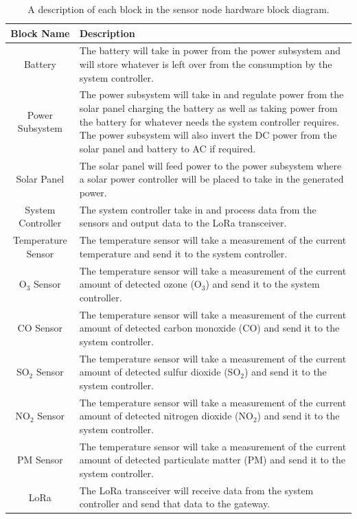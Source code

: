 \documentclass[titlepage, 11pt, letterpaper]{article}
\begin{document}
\begin{table}[H]
    \centering
    \caption{A description of each block in the sensor node hardware block diagram.}
    \begin{tabularx}{\linewidth}{|c|X|}
        \hline
        Block Name & Description \\ 
        \hline
        Battery & The battery will take in power from the power subsystem and will store whatever is left over from the consumption by the system controller. \\\hline
        Power Subsystem & The power subsystem will take in and regulate power from the solar panel charging the battery as well as taking power from the battery for whatever needs the system controller requires. The power subsystem will also invert the DC power from the solar panel and battery to AC if required. \\\hline
        Solar Panel & The solar panel will feed power to the power subsystem where a solar power controller will be placed to take in the generated power. \\\hline
        System Controller & The system controller take in and process data from the sensors and output data to the LoRa transceiver. \\\hline
        Temperature Sensor & The temperature sensor will take a measurement of the current temperature and send it to the system controller. \\\hline
        O$_3$ Sensor & The temperature sensor will take a measurement of the current amount of detected ozone (O$_3$) and send it to the system controller. \\\hline
        CO Sensor & The temperature sensor will take a measurement of the current amount of detected carbon monoxide (CO) and send it to the system controller. \\\hline
        SO$_2$ Sensor & The temperature sensor will take a measurement of the current amount of detected sulfur dioxide (SO$_2$) and send it to the system controller. \\\hline
        NO$_2$ Sensor & The temperature sensor will take a measurement of the current amount of detected nitrogen dioxide (NO$_2$) and send it to the system controller. \\\hline
        PM Sensor & The temperature sensor will take a measurement of the current amount of detected particulate matter (PM) and send it to the system controller. \\\hline
        LoRa & The LoRa transceiver will receive data from the system controller and send that data to the gateway. \\\hline
    \end{tabularx}
    
    \label{tab:descHWNodeBD}
\end{table}
\end{document}
